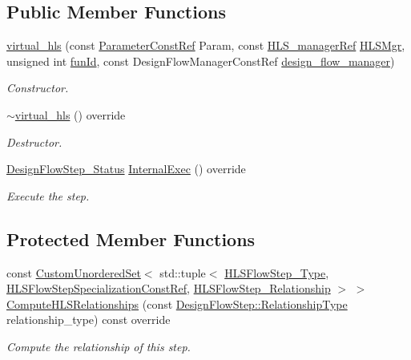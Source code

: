 \subsection*{Public Member Functions}
\begin{DoxyCompactItemize}
\item 
\hyperlink{classvirtual__hls_a59f21603b7d72db8864ccf8f504096cc}{virtual\+\_\+hls} (const \hyperlink{Parameter_8hpp_a37841774a6fcb479b597fdf8955eb4ea}{Parameter\+Const\+Ref} Param, const \hyperlink{hls__manager_8hpp_acd3842b8589fe52c08fc0b2fcc813bfe}{H\+L\+S\+\_\+manager\+Ref} \hyperlink{classHLS__step_ade85003a99d34134418451ddc46a18e9}{H\+L\+S\+Mgr}, unsigned int \hyperlink{classHLSFunctionStep_a3e6434fd86c698b0c70520b859bff5b0}{fun\+Id}, const Design\+Flow\+Manager\+Const\+Ref \hyperlink{classDesignFlowStep_ab770677ddf087613add30024e16a5554}{design\+\_\+flow\+\_\+manager})
\begin{DoxyCompactList}\small\item\em Constructor. \end{DoxyCompactList}\item 
\hyperlink{classvirtual__hls_aaf2320e2bd655ec27aff49b0f7c88836}{$\sim$virtual\+\_\+hls} () override
\begin{DoxyCompactList}\small\item\em Destructor. \end{DoxyCompactList}\item 
\hyperlink{design__flow__step_8hpp_afb1f0d73069c26076b8d31dbc8ebecdf}{Design\+Flow\+Step\+\_\+\+Status} \hyperlink{classvirtual__hls_adc3c37352b9e21cb7dc611f39b9b62bd}{Internal\+Exec} () override
\begin{DoxyCompactList}\small\item\em Execute the step. \end{DoxyCompactList}\end{DoxyCompactItemize}
\subsection*{Protected Member Functions}
\begin{DoxyCompactItemize}
\item 
const \hyperlink{classCustomUnorderedSet}{Custom\+Unordered\+Set}$<$ std\+::tuple$<$ \hyperlink{hls__step_8hpp_ada16bc22905016180e26fc7e39537f8d}{H\+L\+S\+Flow\+Step\+\_\+\+Type}, \hyperlink{hls__step_8hpp_a5fdd2edf290c196531d21d68e13f0e74}{H\+L\+S\+Flow\+Step\+Specialization\+Const\+Ref}, \hyperlink{hls__step_8hpp_a3ad360b9b11e6bf0683d5562a0ceb169}{H\+L\+S\+Flow\+Step\+\_\+\+Relationship} $>$ $>$ \hyperlink{classvirtual__hls_abf09f6655b1a871eec7bd61bc6c9d1dd}{Compute\+H\+L\+S\+Relationships} (const \hyperlink{classDesignFlowStep_a723a3baf19ff2ceb77bc13e099d0b1b7}{Design\+Flow\+Step\+::\+Relationship\+Type} relationship\+\_\+type) const override
\begin{DoxyCompactList}\small\item\em Compute the relationship of this step. \end{DoxyCompactList}\end{DoxyCompactItemize}
